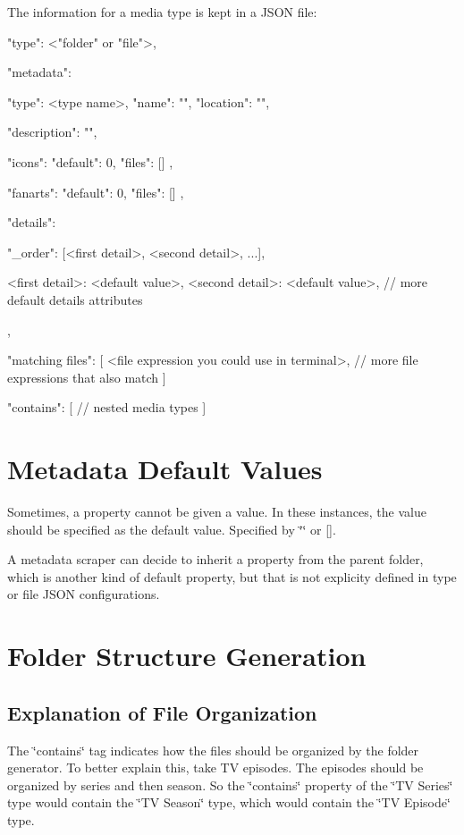 The information for a media type is kept in a J\-S\-O\-N file\-: \begin{DoxyVerb}{
    "type": <"folder" or "file">,

    "metadata": {
        "type": <type name>,
        "name": "",
        "location": "",

        "description": "",

        "icons": {
            "default": 0,
            "files": []
        },

        "fanarts": {
            "default": 0,
            "files": []
        },

        "details": {
            "_order": [<first detail>, <second detail>, ...],

            <first detail>: <default value>,
            <second detail>: <default value>,
            // more default details attributes
        }
    },

    "matching files": [
        <file expression you could use in terminal>,
        // more file expressions that also match
    ]

    "contains": [
        // nested media types
    ]
}
\end{DoxyVerb}


\section*{Metadata Default Values}

Sometimes, a property cannot be given a value. In these instances, the value should be specified as the default value. Specified by {\ttfamily \char`\"{}\char`\"{}} or {\ttfamily \mbox{[}\mbox{]}}.

A metadata scraper can decide to inherit a property from the parent folder, which is another kind of default property, but that is not explicity defined in type or file J\-S\-O\-N configurations.

\section*{Folder Structure Generation}

\subsection*{Explanation of File Organization}

The {\ttfamily \char`\"{}contains\char`\"{}} tag indicates how the files should be organized by the folder generator. To better explain this, take T\-V episodes. The episodes should be organized by series and then season. So the {\ttfamily \char`\"{}contains\char`\"{}} property of the {\ttfamily \char`\"{}\-T\-V Series\char`\"{}} type would contain the {\ttfamily \char`\"{}\-T\-V Season\char`\"{}} type, which would contain the {\ttfamily \char`\"{}\-T\-V Episode\char`\"{}} type.

